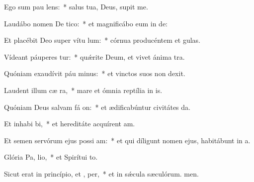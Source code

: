 \item Ego sum pau  lens:~* salus tua, Deus, supit me.
\item Laudábo nomen De  tico:~* et magnificábo eum in de:
\item Et placébit Deo super vítu lum:~* córnua producéntem et gulas.
\item Vídeant páuperes  tur:~* quǽrite Deum, et vivet ánima tra.
\item Quóniam exaudívit páu minus:~* et vinctos suos non dexit.
\item Laudent illum cæ  ra,~* mare et ómnia reptília in is.
\item Quóniam Deus salvam fá on:~* et ædificabúntur civitátes da.
\item Et inhabi bi,~* et hereditáte acquírent am.
\item Et semen servórum ejus possi am:~* et qui díligunt nomen ejus, habitábunt in a.
\item Glória Pa,  lio,~* et Spirítui to.
\item Sicut erat in princípio, et ,  per,~* et in sǽcula sæculórum. men.
